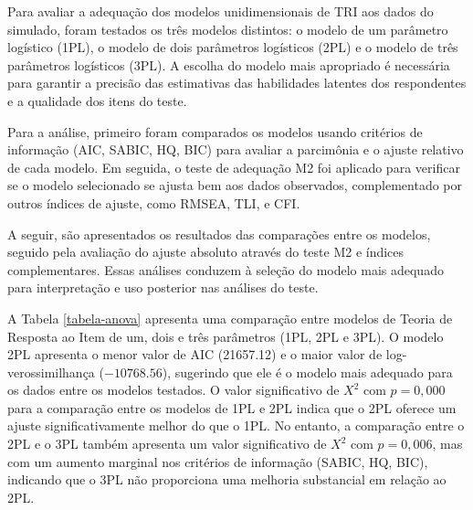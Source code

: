 Para avaliar a adequação dos modelos unidimensionais de TRI aos dados do simulado, foram testados os três modelos distintos: o modelo de um parâmetro logístico (1PL), o modelo de dois parâmetros logísticos (2PL) e o modelo de três parâmetros logísticos (3PL). A escolha do modelo mais apropriado é necessária para garantir a precisão das estimativas das habilidades latentes dos respondentes e a qualidade dos itens do teste.

Para a análise, primeiro foram comparados os modelos usando critérios de informação (AIC, SABIC, HQ, BIC) para avaliar a parcimônia e o ajuste relativo de cada modelo. Em seguida, o teste de adequação M2 foi aplicado para verificar se o modelo selecionado se ajusta bem aos dados observados, complementado por outros índices de ajuste, como RMSEA, TLI, e CFI.

A seguir, são apresentados os resultados das comparações entre os modelos, seguido pela avaliação do ajuste absoluto através do teste M2 e índices complementares. Essas análises conduzem à seleção do modelo mais adequado para interpretação e uso posterior nas análises do teste.


\begin{table}[!htb]
\end{table}

A Tabela \ref{tabela-anova} apresenta uma comparação entre modelos de Teoria de Resposta ao Item de um, dois e três parâmetros (1PL, 2PL e 3PL). O modelo 2PL apresenta o menor valor de AIC (21657.12) e o maior valor de log-verossimilhança ($-10768.56$), sugerindo que ele é o modelo mais adequado para os dados entre os modelos testados. O valor significativo de $X^2$
com $p = 0,000$ para a comparação entre os modelos de 1PL e 2PL indica que o 2PL oferece um ajuste significativamente melhor do que o 1PL. No entanto, a comparação entre o 2PL e o 3PL também apresenta um valor significativo de $X^2$ com $p=0,006$, mas com um aumento marginal nos critérios de informação (SABIC, HQ, BIC), indicando que o 3PL não proporciona uma melhoria substancial em relação ao 2PL. 

